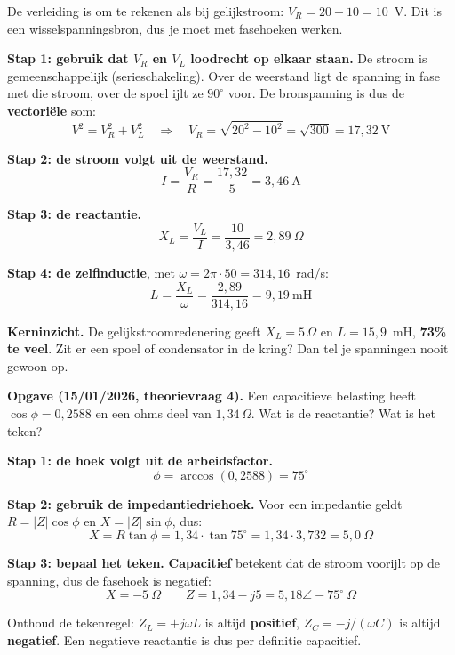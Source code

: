 \documentclass[a4paper,11pt]{article}
\begin{document}
\begin{oefenblok}

    \begin{waarschuwing}
        De verleiding is om te rekenen als bij gelijkstroom: $V_R = 20 - 10 = 10$~V.
         Dit is een wisselspanningsbron, dus je moet met fasehoeken werken.
    \end{waarschuwing}

    \textbf{Stap 1: gebruik dat $V_R$ en $V_L$ loodrecht op elkaar staan.}
    De stroom is gemeenschappelijk (serieschakeling). Over de weerstand ligt de spanning in fase
    met die stroom, over de spoel ijlt ze $90^\circ$ voor. De bronspanning is dus de
    \textbf{vectoriële} som:
    \[V^2 = V_R^2 + V_L^2 \quad\Rightarrow\quad V_R = \sqrt{20^2 - 10^2} = \sqrt{300} = 17{,}32\ \text{V}\]

    \textbf{Stap 2: de stroom volgt uit de weerstand.}
    \[I = \frac{V_R}{R} = \frac{17{,}32}{5} = 3{,}46\ \text{A}\]

    \textbf{Stap 3: de reactantie.}
    \[X_L = \frac{V_L}{I} = \frac{10}{3{,}46} = 2{,}89\ \Omega\]

    \textbf{Stap 4: de zelfinductie}, met $\omega = 2\pi \cdot 50 = 314{,}16$~rad/s:
    \[L = \frac{X_L}{\omega} = \frac{2{,}89}{314{,}16} = \boxed{9{,}19\ \text{mH}}\]

    \textbf{Kerninzicht.} De gelijkstroomredenering geeft $X_L = 5\,\Omega$ en $L = 15{,}9$~mH,
    \textbf{73\% te veel}. Zit er een spoel of condensator in de kring? Dan tel je spanningen nooit
    gewoon op.
\end{oefenblok}

\textbf{Opgave (15/01/2026, theorievraag 4).}
Een capacitieve belasting heeft $\cos\phi = 0{,}2588$ en een ohms deel van $1{,}34\,\Omega$.
Wat is de reactantie? Wat is het teken?

\begin{oefenblok}

    \textbf{Stap 1: de hoek volgt uit de arbeidsfactor.}
    \[\phi = \arccos(0{,}2588) = 75^\circ\]

    \textbf{Stap 2: gebruik de impedantiedriehoek.}
    Voor een impedantie geldt $R = |Z|\cos\phi$ en $X = |Z|\sin\phi$, dus:
    \[X = R\tan\phi = 1{,}34 \cdot \tan 75^\circ = 1{,}34 \cdot 3{,}732 = 5{,}0\ \Omega\]

    \textbf{Stap 3: bepaal het teken.}
    \textbf{Capacitief} betekent dat de stroom voorijlt op de spanning, dus de fasehoek is negatief:
    \[\boxed{X = -5\ \Omega} \qquad Z = 1{,}34 - j5 = 5{,}18\angle -75^\circ\ \Omega\]

    \begin{examenbox}
        Onthoud de tekenregel: $Z_L = +j\omega L$ is altijd \textbf{positief}, $Z_C = -j/(\omega C)$
        is altijd \textbf{negatief}. Een negatieve reactantie is dus per definitie capacitief.
    \end{examenbox}
\end{oefenblok}
\end{document}
